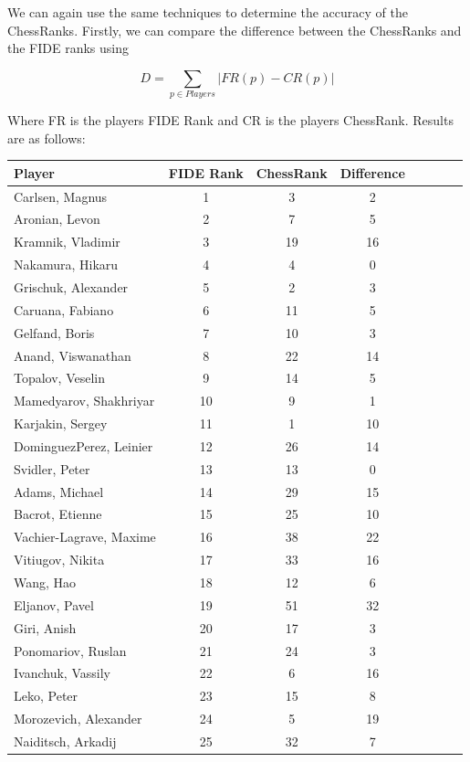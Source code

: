 \documentclass[pdftex,11pt,a4paper]{report}
\begin{document}
We can again use the same techniques to determine the accuracy of the ChessRanks.
Firstly, we can compare the difference between the ChessRanks and the FIDE ranks using

$$
   D = \sum\limits_{p \in Players} | FR(p) - CR(p) |
$$

Where FR is the players FIDE Rank and CR is the players ChessRank. Results are as follows:

\begin{singlespace}
\begin{tabular}{l*{6}{c}r}
Player & FIDE Rank & ChessRank & Difference \\ 
\hline
Carlsen, Magnus & 1 & 3 & 2  \\ 
Aronian, Levon & 2 & 7 & 5  \\ 
Kramnik, Vladimir & 3 & 19 & 16  \\ 
Nakamura, Hikaru & 4 & 4 & 0  \\ 
Grischuk, Alexander & 5 & 2 & 3  \\ 
Caruana, Fabiano & 6 & 11 & 5  \\ 
Gelfand, Boris & 7 & 10 & 3  \\ 
Anand, Viswanathan & 8 & 22 & 14  \\ 
Topalov, Veselin & 9 & 14 & 5  \\ 
Mamedyarov, Shakhriyar & 10 & 9 & 1  \\ 
Karjakin, Sergey & 11 & 1 & 10  \\ 
DominguezPerez, Leinier & 12 & 26 & 14  \\ 
Svidler, Peter & 13 & 13 & 0  \\ 
Adams, Michael & 14 & 29 & 15  \\ 
Bacrot, Etienne & 15 & 25 & 10  \\ 
Vachier-Lagrave, Maxime & 16 & 38 & 22  \\ 
Vitiugov, Nikita & 17 & 33 & 16  \\ 
Wang, Hao & 18 & 12 & 6  \\ 
Eljanov, Pavel & 19 & 51 & 32  \\ 
Giri, Anish & 20 & 17 & 3  \\ 
Ponomariov, Ruslan & 21 & 24 & 3  \\ 
Ivanchuk, Vassily & 22 & 6 & 16  \\ 
Leko, Peter & 23 & 15 & 8  \\ 
Morozevich, Alexander & 24 & 5 & 19  \\ 
Naiditsch, Arkadij & 25 & 32 & 7  \\ 

\end{tabular}
\end{singlespace}
\end{document}
